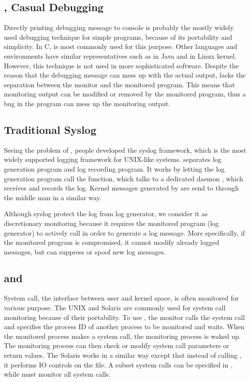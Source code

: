\subsection{, Casual Debugging}
\label{sec:printf}

Directly printing debugging message to console
is probably the mostly widely used debugging technique
for simple programs, because of its portability and simplicity.
In C,  is most commonly used for this purpose.
Other languages and environments have similar representatives
such as  in Java and
 in Linux kernel.
However, this technique is not used in more sophisticated software.
Despite the reason that the debugging message can mess up
with the actual output,  lacks the
separation between the monitor and the monitored program.
This means that monitoring output can be modified or removed by the monitored
program, thus a bug in the program can mess up the monitoring output.


\subsection{Traditional Syslog}
\label{sec:syslog}

Seeing the problem of , people developed the syslog
framework, which is the most widely supported logging framework for UNIX-like systems.
 separates log generation program and log recording program.
It works by letting the log generation program call the 
function, which talks to a dedicated daemon ,
which receives and records the log.
Kernel messages generated by  are send to  through
the middle man  in a similar way.

Although syslog protect the log from log generator,
we consider it as discretionary monitoring because it
requires the monitored program (log generator) to actively call
 in order to generate a log message.
More specifically, if the monitored program is compromised,
it cannot modify already logged messages, but can suppress or spoof
new log messages.

\subsection{ and }
\label{sec:ptrace}

System call, the interface between user and kernel space,
is often monitored for various purpose.
The UNIX  and Solaris  are commonly
used for system call monitoring because of their portability.
To use , the monitor calls the  system call
and specifies the process ID of another process to be monitored and waits.
When the monitored process makes a system call, the monitoring
process is waked up.
The monitoring process can then check or modify
system call parameters or return values.
The Solaris  works in a similar way except that
instead of calling , it performs IO controls on the
 file.
A subset system calls can be specified in ,
while  must monitor all system calls.

